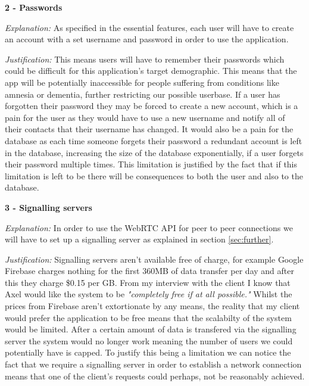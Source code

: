 \textbf{2 - Passwords} \\ \vspace{0.1cm}

\textit{Explanation:}
As specified in the essential features, each user will have to 
create an account with a set username and password in order to 
use the application. \vspace{0.1cm}

\textit{Justification:} This means users will have to remember 
their passwords which could be difficult for this application's
target demographic. This means that the app will be
potentially inaccessible for people suffering from conditions
like amnesia or dementia, further restricting our possible 
userbase. If a user has forgotten their password they
may be forced to create a new account, which is a pain for the 
user as they would have to use a new username and notify all of
their contacts that their username has changed. It would also 
be a pain for the database as each time someone forgets their 
password a redundant account is left in the database, 
increasing the size of the database exponentially, if a user 
forgets their password multiple times. This limitation is 
justified by the fact that if this limitation is left to be
there will be consequences to both the user and also to the 
database. \\ \vspace{0.2cm}

\textbf{3 - Signalling servers} \\ \vspace{0.1cm}

\textit{Explanation:}
In order to use the WebRTC API for peer to peer connections we
will have to set up a signalling server as explained in 
section \ref{sec:further}. \vspace{0.1cm}

\textit{Justification:}
Signalling servers aren't
available free of charge, for example Google Firebase charges
nothing for the 
first 360MB of data transfer per day and after this they charge
\$0.15 per GB. From my interview with the client I know that 
Axel would like the system to be \textit{"completely free if
at all possible."} Whilst the prices from Firebase aren't 
extortionate by any means, the reality that my client would
prefer the application to be free means that the scalabilty of
the system would be limited. After a certain amount of data is 
transfered via the signalling server the system would no longer
work meaning the number of users we could potentially have is 
capped. To justify this being a limitation we can notice 
the fact that we require a signalling server in order to
establish a network connection means that one of the client's
requests could perhaps, not be reasonably achieved. \\
\vspace{0.2cm}

